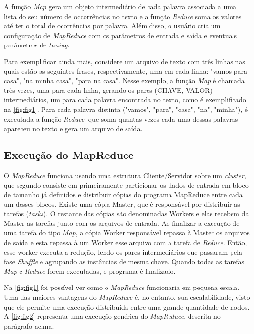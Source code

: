 A função \textit{Map} gera um objeto intermediário de cada palavra associada a uma lista do seu número de occorrências no texto e a função \textit{Reduce} soma os valores até ter o total de ocorrências por palavra. Além disso, o usuário cria um configuração de \textit{MapReduce} com os parâmetros de entrada e saída e eventuais parâmetros de \textit{tuning}.

Para exemplificar ainda mais, considere um arquivo de texto com três linhas nas quais estão as seguintes frases, respectivamente, uma em cada linha: "vamos para casa", "na minha casa", "para na casa". Nesse exemplo, a função \textit{Map} é chamada três vezes, uma para cada linha, gerando os pares (CHAVE, VALOR) intermediários, um para cada palavra encontrada no texto, como é exemplificado na \autoref{fig:fig1}. Para cada palavra distinta ("vamos", "para", "casa", "na", "minha"), é executada a função \textit{Reduce}, que soma quantas vezes cada uma dessas palavras apareceu no texto e gera um arquivo de saída.


\subsection{Execução do MapReduce}\label{ssec:execucaomapreduce}

O \textit{MapReduce} funciona usando uma estrutura Cliente/Servidor sobre um \textit{cluster}, que segundo \textcite{MapReduce08} consiste em primeiramente particionar os dados de entrada em bloco de tamanho já definidos e distribuir cópias do programa MapReduce entre cada um desses blocos. Existe uma cópia Master, que é responsável por distribuir as tarefas (\textit{tasks}). O restante das cópias são denominadas Workers e elas recebem da Master as tarefas junto com os arquivos de entrada. Ao finalizar a execução de uma tarefa do tipo \textit{Map}, a cópia Worker responsável repassa à Master os arquivos de saída e esta repassa à um Worker esse arquivo com a tarefa de \textit{Reduce}. Então, esse worker executa a redução, lendo os pares intermediários que passaram pela fase \textit{Shuffle} e agrupando as instâncias de mesma chave. Quando todas as tarefas \textit{Map} e \textit{Reduce} forem executadas, o programa é finalizado.

Na \autoref{fig:fig1} foi possível ver como o \textit{MapReduce} funcionaria em pequena escala. Uma das maiores vantagens do \textit{MapReduce} é, no entanto, sua escalabilidade, visto que ele permite uma execução distribuída entre uma grande quantidade de nodos. A \autoref{fig:fig2}  representa uma execução genérica do \textit{MapReduce}, descrita no parágrafo acima.

